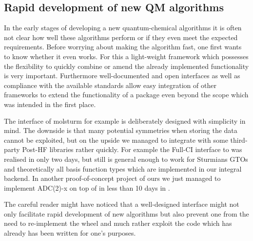 
\subsection{Rapid development of new QM algorithms}

In the early stages of developing a new quantum-chemical algorithms
it is often not clear how well these algorithms perform
or if they even meet the expected requirements.
Before worrying about making the algorithm fast,
one first wants to know whether it even works.
For this a light-weight framework which possesses the flexibility
to quickly combine or amend the already implemented
functionality is very important.
Furthermore well-documented and open interfaces
as well as compliance with the available standards
allow easy integration of other frameworks to extend
the functionality of a package even beyond the scope
which was intended in the first place.

The \python interface of molsturm for example is deliberately designed
with simplicity in mind.
The downside is that many potential symmetries when storing the data
cannot be exploited,
but on the upside we managed to integrate \molsturm
with some third-party Post-HF libraries rather quickly.
For example the Full-CI interface to \pyscf was realised in only two days,
but still is general enough to work for Sturmians GTOs and theoretically
all basis function types which are implemented in our integral backend.
In another proof-of-concept project of ours we just managed to
implement ADC(2)-x on top of \molsturm in less than 10 days in \python.

The careful reader might have noticed that a well-designed interface
might not only facilitate rapid development of new algorithms
but also prevent one from the need to re-implement the wheel
and much rather exploit the code which has already has been written
for one's purposes.

%


